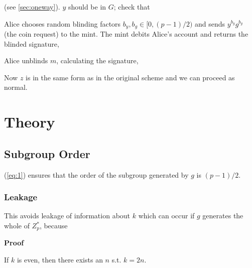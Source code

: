 \documentclass[a4paper,titlepage]{article}
\begin{document}

(see \ref{sec:oneway}). $y$ should be in $G$; check that


Alice chooses random blinding factors $b_y,b_g \in [0,(p-1)/2)$ and
sends $y^{b_y} g^{b_g}$ (the coin request) to the mint. The mint
debits Alice's account and returns the blinded signature,


Alice unblinds $m$, calculating the signature,


Now $z$ is in the same form as in the original scheme and we can
proceed as normal.

\section{Theory}

\subsection{Subgroup Order}
\label{sec:theory1}

(\ref{eq:1}) ensures that the order of the subgroup generated by $g$ is
$(p-1)/2$.

\subsubsection{Leakage}

This avoids leakage of information about $k$ which can
occur if $g$ generates the whole of $Z_p^*$, because


{\bf Proof}

If $k$ is even, then there exists an $n$
s.t. $k=2n$.

\end{document}

